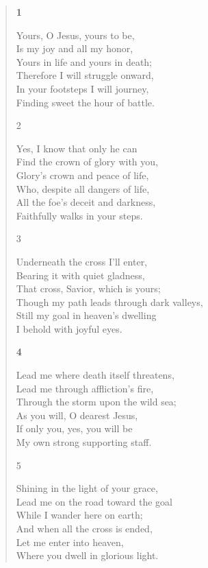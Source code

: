 \begin{quote}
\medskip
\textbf{1}

Yours, O Jesus, yours to be,\\
Is my joy and all my honor,\\
Yours in life and yours in death;\\
Therefore I will struggle onward,\\
In your footsteps I will journey,\\
Finding sweet the hour of battle.

\medskip

2

Yes, I know that only he can\\
Find the crown of glory with you,\\
Glory’s crown and peace of life,\\
Who, despite all dangers of life,\\
All the foe’s deceit and darkness,\\
Faithfully walks in your steps.

\medskip

3

Underneath the cross I’ll enter,\\
Bearing it with quiet gladness,\\
That cross, Savior, which is yours;\\
Though my path leads through dark valleys,\\
Still my goal in heaven’s dwelling\\
I behold with joyful eyes.

\medskip

\textbf{4}

Lead me where death itself threatens,\\
Lead me through affliction’s fire,\\
Through the storm upon the wild sea;\\
As you will, O dearest Jesus,\\
If only you, yes, you will be\\
My own strong supporting staff.

\medskip

5

Shining in the light of your grace,\\
Lead me on the road toward the goal\\
While I wander here on earth;\\
And when all the cross is ended,\\
Let me enter into heaven,\\
Where you dwell in glorious light.

\end{quote}

